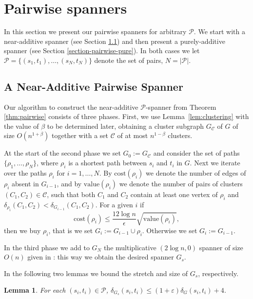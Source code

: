 \documentclass[a4paper,11pt]{article}
\newtheorem{lemma}{Lemma}[section]
\theoremstyle{definition}
\newcommand{\dist}{\delta}
\newcommand{\cost}{\mathrm{cost}}
\newcommand{\val}{\mathrm{value}}
\newcommand{\cP}{\mathcal{P}}
\newcommand{\cC}{\mathcal{C}}
\newcommand{\eps}{\varepsilon}
\begin{document}
\section{Pairwise spanners}
\label{section-pairwise}

In this section we present our pairwise spanners for arbitrary $\cP$. We start with a near-additive spanner (see Section \ref{section-pairwise-near}) and then present a purely-additive spanner (see Section \ref{section-pairwise-pure}). In both cases we let $\cP=\{(s_1,t_1),\ldots,(s_N,t_N)\}$ denote the set of pairs, $N=|\cP|$.



\subsection{A Near-Additive Pairwise Spanner}
\label{section-pairwise-near}

Our algorithm to construct the near-additive $\mathcal{P}$-spanner from Theorem \ref{thm:pairwise} consists of three phases. First, 
we use Lemma~\ref{lem:clustering} with the value of $\beta$
to be determined later, obtaining a cluster subgraph $G_\cC$ of $G$
of size $O(n^{1+\beta})$ together with a set $\cC$ of at most $n^{1-\beta}$ clusters.

At the start of the second phase we set $G_0 := G_\cC$ and consider the set of paths  $\{\rho_1,\ldots,\rho_N\}$, where $\rho_i$ 
is a shortest path between $s_i$ and $t_i$ in $G$.
Next we iterate over the paths $\rho_i$ for  $i=1,\ldots,N$.
By $\cost(\rho_i)$ we denote the number of edges of $\rho_i$
absent in $G_{i-1}$, and by $\val(\rho_i)$ we denote the number of 
pairs of clusters $(C_1,C_2) \in \cC$, such that both $C_1$ and $C_2$ contain at
least one vertex of $\rho_i$ and $\dist_{\rho_i}(C_1,C_2) < \dist_{G_{i-1}}(C_1,C_2)$.
For a given $i$ if
$$\cost(\rho_i) \le \frac{12\log n}{\epsilon} \sqrt{\val(\rho_i)},$$
then we buy $\rho_i$, that is we set $G_i:= G_{i-1} \cup \rho_i$. Otherwise we set $G_i:= G_{i-1}$.

In the third phase we add to $G_N$ the multiplicative $(2\log n,0)$ spanner of size $O(n)$ given in \cite{HZ96}: this way we obtain the desired spanner $G_s$.






In the following two lemmas we bound the stretch and size of $G_s$, respectively.

\begin{lemma}
\label{lem:stretchPairwise1}
For each $(s_i,t_i)\in \cP$, $\dist_{G_s}(s_i,t_i)\leq (1+\eps)\dist_G(s_i,t_i)+4$.
\end{lemma}
\end{document}

